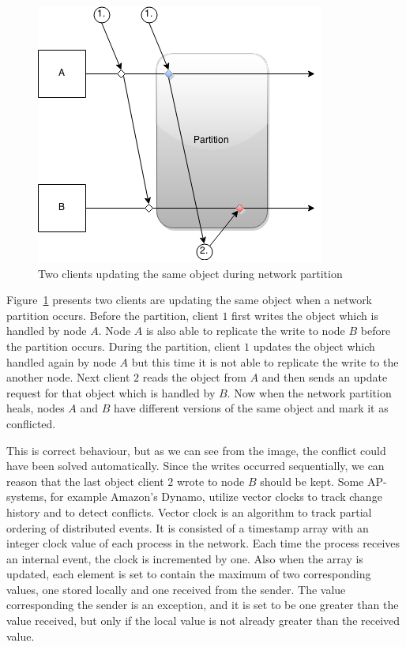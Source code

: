 \begin{figure}[h!]
  \centering
    \includegraphics[scale=0.7]{pictures/apexample.png}
  \caption{Two clients updating the same object during network partition}
\label{ap-example}
\end{figure}

Figure~\ref{ap-example} presents two clients are updating the same object when a
network partition occurs.  Before the partition, client \(1\) first writes the
object which is handled by node \(A\). Node \(A\) is also able to replicate the
write to node \(B\) before the partition occurs. During the partition, client
\(1\) updates the object which handled again by node \(A\) but this time it is
not able to replicate the write to the another node. Next client \(2\) reads the
object from \(A\) and then sends an update request for that object which is
handled by \(B\). Now when the network partition heals, nodes \(A\) and \(B\)
have different versions of the same object and mark it as conflicted.

This is correct behaviour, but as we can see from the image, the conflict could
have been solved automatically. Since the writes occurred sequentially, we can
reason that the last object client \(2\) wrote to node \(B\) should be kept.
Some AP-systems, for example Amazon's Dynamo, utilize vector clocks to track
change history and to detect conflicts\cite{decandia2007dynamo}. Vector clock is
an algorithm to track partial ordering of distributed
events\cite{fidge1987timestamps}. It is consisted of a timestamp array with an
integer clock value of each process in the network. Each time the process
receives an internal event, the clock is incremented by one. Also when the array
is updated, each element is set to contain the maximum of two corresponding
values, one stored locally and one received from the sender. The value
corresponding the sender is an exception, and it is set to be one greater than
the value received, but only if the local value is not already greater than the
received value.

